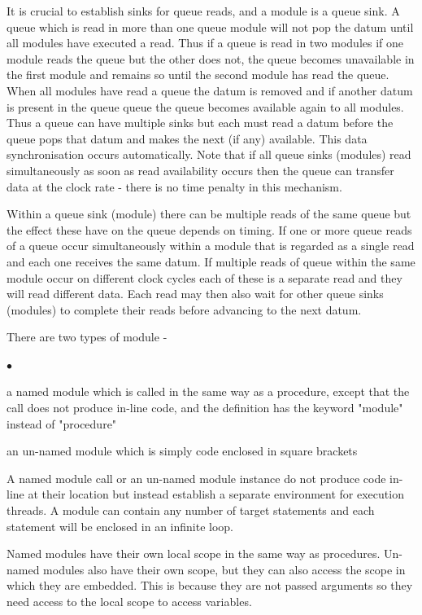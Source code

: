 \documentclass[10pt,a4paper,twoside,fleqn]{article}
\newcommand{\blist}{\begin{list}{$\bullet$}{\setlength{\itemsep}{-5pt}\setlength{\topsep}{-5pt}}}
\newcommand{\blend}{\end{list}}
\begin{document}
    It is crucial to establish sinks for queue reads, and a module is a queue sink. A
    queue which is read in more than one queue module will not pop the datum until
    all modules have executed a read. Thus if a queue is read in two modules if one
    module reads the queue but the other does not, the queue becomes unavailable in
    the first module and remains so until the second module has read the queue. When
    all modules have read a queue the datum is removed and if another datum is
    present in the queue queue the queue becomes available again to all modules. Thus
    a queue can have multiple sinks but each must read a datum before the queue pops
    that datum and makes the next (if any) available. This data synchronisation
    occurs automatically. Note that if all queue sinks (modules) read simultaneously
    as soon as read availability occurs then the queue can transfer data at the
    clock rate - there is no time penalty in this mechanism.
    
    Within a queue sink (module) there can be multiple reads of the same queue but
    the effect these have on the queue depends on timing. If one or more queue reads
    of a queue occur simultaneously within a module that is regarded as a single
    read and each one receives the same datum. If multiple reads of queue within the
    same module occur on different clock cycles each of these is a separate read
    and they will read different data. Each read may then also wait for other queue
    sinks (modules) to complete their reads before advancing to the next datum.
    
    There are two types of module -
    \blist
    \item   a named module which is called in the same way as a procedure,
            except that the call does not produce in-line code, and
            the definition has the keyword "module" instead of "procedure"
    \item   an un-named module which is simply code enclosed in square brackets
    \blend
    
    A named module call or an un-named module instance do not produce code
    in-line at their location but instead establish a separate environment for
    execution threads.
    A module can contain any number of target statements and each statement will be
    enclosed in an infinite loop.
    
    Named modules have their own local scope in the same way as procedures.
    Un-named modules also have their own scope, but they can also access the
    scope in which they are embedded. This is because they are not passed
    arguments so they need access to the local scope to access variables.
    
\end{document}
